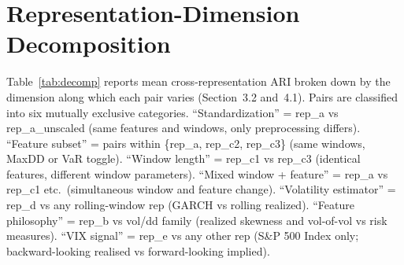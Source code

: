 \documentclass[preprint,12pt,authoryear]{elsarticle}
\newcommand{\SPX}{S\&P 500 Index}
\begin{document}
\section{Representation-Dimension Decomposition}
\label{app:decomp}

Table~\ref{tab:decomp} reports mean cross-representation ARI broken down by the dimension along which each pair varies (Section~3.2 and~4.1). Pairs are classified into six mutually exclusive categories. ``Standardization'' = rep\_a vs rep\_a\_unscaled (same features and windows, only preprocessing differs). ``Feature subset'' = pairs within \{rep\_a, rep\_c2, rep\_c3\} (same windows, MaxDD or VaR toggle). ``Window length'' = rep\_c1 vs rep\_c3 (identical features, different window parameters). ``Mixed window + feature'' = rep\_a vs rep\_c1 etc.\ (simultaneous window and feature change). ``Volatility estimator'' = rep\_d vs any rolling-window rep (GARCH vs rolling realized). ``Feature philosophy'' = rep\_b vs vol/dd family (realized skewness and vol-of-vol vs risk measures). ``VIX signal'' = rep\_e vs any other rep (\SPX{} only; backward-looking realised vs forward-looking implied).
\end{document}
